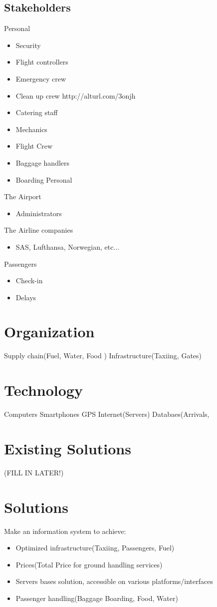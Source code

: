 \subsection{Stakeholders} 
\label{Stakeholders}

Personal
\begin{itemize}
\item Security
\item Flight controllers
\item Emergency crew
\item Clean up crew http://alturl.com/3onjh
\item Catering staff
\item Mechanics
\item Flight Crew
\item Baggage handlers
\item Boarding Personal
\end{itemize}

The Airport
\begin{itemize}
\item Administrators
\end{itemize}

The Airline companies
\begin{itemize}
\item SAS, Lufthansa, Norwegian, etc...
\end{itemize}

Passengers
\begin{itemize}
\item Check-in
\item Delays
\end{itemize}
	
\section{Organization}
\label{Organization}
Supply chain(Fuel, Water, Food )	
Infrastructure(Taxiing, Gates)
	
\section{Technology}
\label{Technology}
Computers
Smartphones
GPS
Internet(Servers)
Databaes(Arrivals, 

\section{Existing Solutions}
\label{Existing Solutions}
(FILL IN LATER!)

\section{Solutions}
\label{Solutons}
Make an information system to achieve:
\begin{itemize}
\item Optimized infrastructure(Taxiing, Passengers, Fuel)
\item Prices(Total Price for ground handling services)
\item Servers bases solution, accessible on various platforms/interfaces
\item Passenger handling(Baggage Boarding, Food, Water)
\end{itemize}